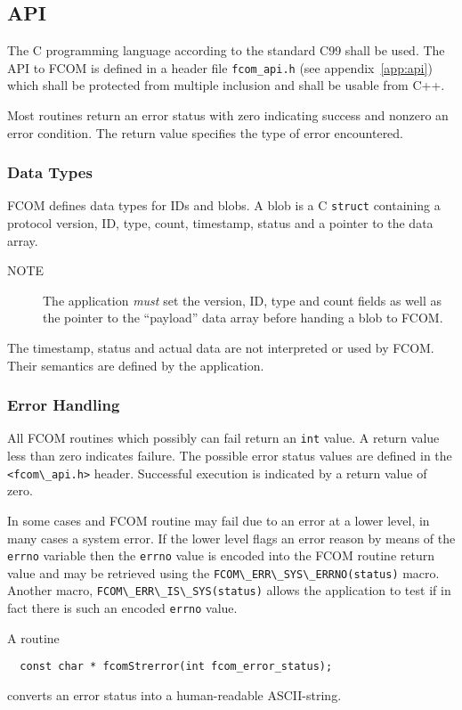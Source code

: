 \documentclass[11pt]{article}
\newcommand{\fcom}{FCOM}
\newcommand{\blob}{blob}
\newcommand{\cstl}[1]{{\lstinline+#1+}}
\newcommand{\note}[1]{
	\begin{description}
		\item[NOTE] #1
	\end{description}
}
\begin{document}
  \subsection{API}
  The C programming language according to the standard C99
  shall be used.
  The API to \fcom{} is defined in a header file {\tt fcom\_api.h}
  (see appendix~\ref{app:api}) which
  shall be protected from multiple inclusion and shall be usable from C++.

  Most routines return an error status with zero indicating success
  and nonzero an error condition. The return value specifies the type
  of error encountered.
    \subsubsection{Data Types}
      \fcom{} defines data types for IDs and \blob{}s. A
      \blob{} is a C {\tt struct} containing a protocol version,
      ID, type, count, timestamp, status and a pointer to
      the data array.

      \note{The application {\em must} set the version, ID, type and count
      fields as well as the pointer to the ``payload'' data array
      before handing a \blob{} to \fcom{}.}

      The timestamp,
      status and actual data are not interpreted or used by \fcom{}.
      Their semantics are defined by the application.
    \subsubsection{Error Handling}
      All \fcom{} routines which possibly can fail return an \cstl{int}
      value. A return value less than zero indicates failure. The
      possible error status values are defined in the \cstl{<fcom\_api.h>}
      header. Successful execution is indicated by a return value of 
      zero.

      In some cases and \fcom{} routine may fail due to an error
      at a lower level, in many cases a system error. If the lower
      level flags an error reason by means of the \cstl{errno} 
      variable then the \cstl{errno} value is encoded into
      the \fcom{} routine return value and may be retrieved using
      the \cstl{FCOM\_ERR\_SYS\_ERRNO(status)} macro.
      Another macro, \cstl{FCOM\_ERR\_IS\_SYS(status)} allows
      the application to test if in fact there is such an encoded
      \cstl{errno} value.

      A routine
      \begin{verbatim}
  const char * fcomStrerror(int fcom_error_status);
      \end{verbatim}
      converts an error status into a human-readable ASCII-string.
\end{document}
